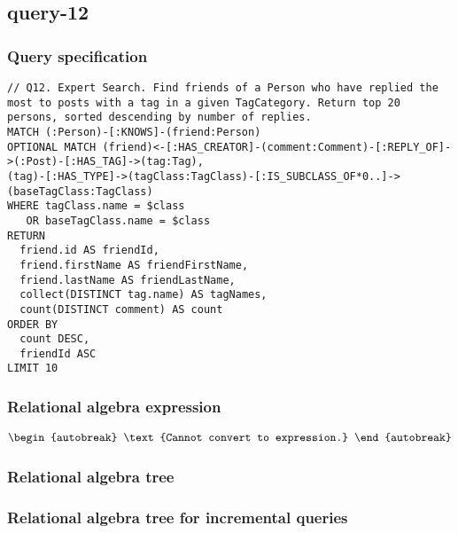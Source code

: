 \subsection{query-12}

\subsubsection*{Query specification}

\begin{lstlisting}
// Q12. Expert Search. Find friends of a Person who have replied the most to posts with a tag in a given TagCategory. Return top 20 persons, sorted descending by number of replies.
MATCH (:Person)-[:KNOWS]-(friend:Person)
OPTIONAL MATCH (friend)<-[:HAS_CREATOR]-(comment:Comment)-[:REPLY_OF]->(:Post)-[:HAS_TAG]->(tag:Tag),
(tag)-[:HAS_TYPE]->(tagClass:TagClass)-[:IS_SUBCLASS_OF*0..]->(baseTagClass:TagClass)
WHERE tagClass.name = $class
   OR baseTagClass.name = $class
RETURN
  friend.id AS friendId,
  friend.firstName AS friendFirstName,
  friend.lastName AS friendLastName,
  collect(DISTINCT tag.name) AS tagNames,
  count(DISTINCT comment) AS count
ORDER BY
  count DESC,
  friendId ASC
LIMIT 10
\end{lstlisting}

\subsubsection*{Relational algebra expression}

\begin{align*}
\begin{autobreak}
\text{Cannot convert to expression.}
\end{autobreak}
\end{align*}

\subsubsection*{Relational algebra tree}


\subsubsection*{Relational algebra tree for incremental queries}

